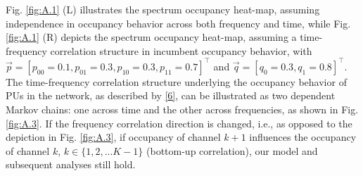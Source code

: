 \documentclass[12pt, draftcls, onecolumn]{IEEEtran}
\begin{document}
Fig. \ref{fig:A.1} (L) illustrates the spectrum occupancy heat-map, assuming independence in occupancy behavior across both frequency and time, while Fig. \ref{fig:A.1} (R) depicts the spectrum occupancy heat-map, assuming a time-frequency correlation structure in incumbent occupancy behavior, with $\vec{p}{=}[p_{00}{=}0.1,p_{01}{=}0.3,p_{10}{=}0.3,p_{11}{=}0.7]^{\intercal}$ and $\vec{q}=[q_{0}{=}0.3,q_{1}{=}0.8]^{\intercal}$. The time-frequency correlation structure underlying the occupancy behavior of PUs in the network, as described by \eqref{6}, can be illustrated as two dependent Markov chains: one across time and the other across frequencies, as shown in Fig. \ref{fig:A.3}. If the frequency correlation direction is changed, i.e., as opposed to the depiction in Fig. \ref{fig:A.3}, if occupancy of channel $k+1$ influences the occupancy of channel $k$, $k{\in}\{1,2,...K{-}1\}$ (bottom-up correlation), our model and subsequent analyses still hold.
\end{document}
